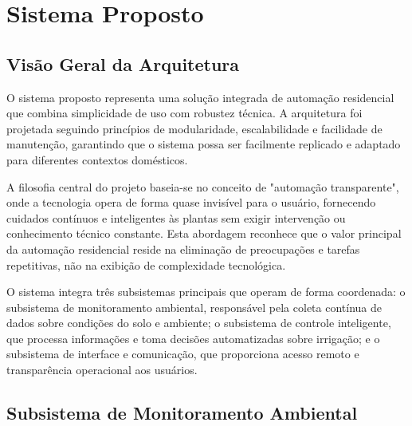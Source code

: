 
\chapter{Sistema Proposto}

\section{Visão Geral da Arquitetura}

O sistema proposto representa uma solução integrada de automação residencial que combina simplicidade de uso com robustez técnica. A arquitetura foi projetada seguindo princípios de modularidade, escalabilidade e facilidade de manutenção, garantindo que o sistema possa ser facilmente replicado e adaptado para diferentes contextos domésticos.

A filosofia central do projeto baseia-se no conceito de "automação transparente", onde a tecnologia opera de forma quase invisível para o usuário, fornecendo cuidados contínuos e inteligentes às plantas sem exigir intervenção ou conhecimento técnico constante. Esta abordagem reconhece que o valor principal da automação residencial reside na eliminação de preocupações e tarefas repetitivas, não na exibição de complexidade tecnológica.

O sistema integra três subsistemas principais que operam de forma coordenada: o subsistema de monitoramento ambiental, responsável pela coleta contínua de dados sobre condições do solo e ambiente; o subsistema de controle inteligente, que processa informações e toma decisões automatizadas sobre irrigação; e o subsistema de interface e comunicação, que proporciona acesso remoto e transparência operacional aos usuários.


\section{Subsistema de Monitoramento Ambiental}

